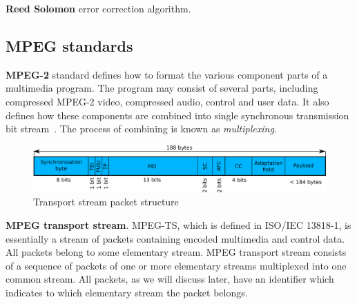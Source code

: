{\bf Reed Solomon} error correction algorithm.

\subsection{MPEG standards}

{\bf MPEG-2} standard defines how to format the various component parts of a 
multimedia program. The program may consist of several parts, including 
compressed MPEG-2 video, compressed audio, control and user data. It 
also defines how these components are combined into single synchronous 
transmission bit stream~\cite{mpegts}. The process of combining is known 
as {\it multiplexing}. 

\begin{figure}[ht]
\includegraphics[width=1\textwidth]{graphics/ts_packet.png}
\caption{Transport stream packet structure}
\label{fig:ts_packet}
\end{figure}

{\bf MPEG transport stream}. MPEG-TS, which is defined in ISO/IEC 13818-1, 
is essentially a stream of packets containing encoded multimedia and control data.
All packets belong to some elementary stream. MPEG transport stream consists of
a sequence of packets of one or more elementary streams multiplexed into 
one common stream. All packets, as we will discuss later, have an identifier
which indicates to which elementary stream the packet belongs.

